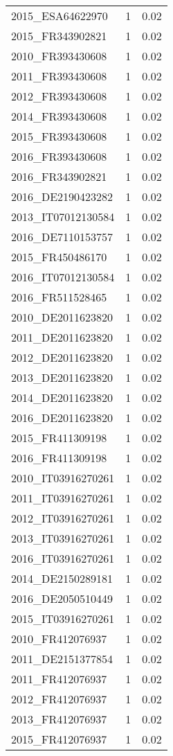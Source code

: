 \begin{table*}[htbp]
\begin{tabular}{lrr}
2015_ESA64622970 & 1 & 0.02 \\
2015_FR343902821 & 1 & 0.02 \\
2010_FR393430608 & 1 & 0.02 \\
2011_FR393430608 & 1 & 0.02 \\
2012_FR393430608 & 1 & 0.02 \\
2014_FR393430608 & 1 & 0.02 \\
2015_FR393430608 & 1 & 0.02 \\
2016_FR393430608 & 1 & 0.02 \\
2016_FR343902821 & 1 & 0.02 \\
2016_DE2190423282 & 1 & 0.02 \\
2013_IT07012130584 & 1 & 0.02 \\
2016_DE7110153757 & 1 & 0.02 \\
2015_FR450486170 & 1 & 0.02 \\
2016_IT07012130584 & 1 & 0.02 \\
2016_FR511528465 & 1 & 0.02 \\
2010_DE2011623820 & 1 & 0.02 \\
2011_DE2011623820 & 1 & 0.02 \\
2012_DE2011623820 & 1 & 0.02 \\
2013_DE2011623820 & 1 & 0.02 \\
2014_DE2011623820 & 1 & 0.02 \\
2016_DE2011623820 & 1 & 0.02 \\
2015_FR411309198 & 1 & 0.02 \\
2016_FR411309198 & 1 & 0.02 \\
2010_IT03916270261 & 1 & 0.02 \\
2011_IT03916270261 & 1 & 0.02 \\
2012_IT03916270261 & 1 & 0.02 \\
2013_IT03916270261 & 1 & 0.02 \\
2016_IT03916270261 & 1 & 0.02 \\
2014_DE2150289181 & 1 & 0.02 \\
2016_DE2050510449 & 1 & 0.02 \\
2015_IT03916270261 & 1 & 0.02 \\
2010_FR412076937 & 1 & 0.02 \\
2011_DE2151377854 & 1 & 0.02 \\
2011_FR412076937 & 1 & 0.02 \\
2012_FR412076937 & 1 & 0.02 \\
2013_FR412076937 & 1 & 0.02 \\
2015_FR412076937 & 1 & 0.02 \\

\end{tabular}
\end{table*}
